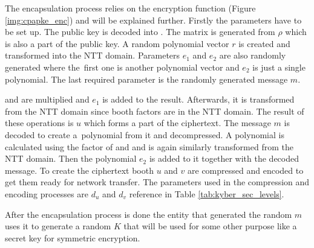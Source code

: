 The encapsulation process relies on the encryption function (Figure \ref{img:cpapke_enc}) and will be explained further. Firstly the parameters have to be set up. The public key is decoded into . The matrix  is generated from $\rho$ which is also a part of the public key. A random polynomial vector $r$ is created and transformed into the NTT domain. Parameters $e_1$ and $e_2$ are also randomly generated where the~first one is another polynomial vector and $e_2$ is just a single polynomial. The last required parameter is the randomly generated message $m$.

 and  are multiplied and $e_1$ is added to the result. Afterwards, it is transformed from the NTT domain since booth factors are in the NTT domain. The result of these operations is $u$ which forms a part of the ciphertext. The message $m$ is decoded to create a~polynomial from it and decompressed. A polynomial is calculated using the factor of  and  and is again similarly transformed from the NTT domain. Then the polynomial $e_2$ is added to it together with the decoded message. To create the ciphertext booth $u$ and $v$ are compressed and encoded to get them ready for network transfer. The parameters used in the compression and encoding processes are $d_u$ and $d_v$ reference in Table \ref{tab:kyber_sec_levels}.

After the encapsulation process is done the entity that generated the random $m$ uses it to generate a random $K$ that will be used for some other purpose like a secret key for symmetric encryption.
